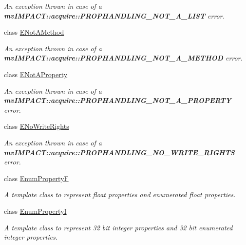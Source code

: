 \begin{DoxyCompactItemize}
\begin{DoxyCompactList}\small\item\em An exception thrown in case of a {\bfseries mv\+I\+M\+P\+A\+C\+T\+::acquire\+::\+P\+R\+O\+P\+H\+A\+N\+D\+L\+I\+N\+G\+\_\+\+N\+O\+T\+\_\+\+A\+\_\+\+L\+I\+S\+T} error. \end{DoxyCompactList}\item 
class \hyperlink{classmv_i_m_p_a_c_t_1_1acquire_1_1_e_not_a_method}{E\+Not\+A\+Method}
\begin{DoxyCompactList}\small\item\em An exception thrown in case of a {\bfseries mv\+I\+M\+P\+A\+C\+T\+::acquire\+::\+P\+R\+O\+P\+H\+A\+N\+D\+L\+I\+N\+G\+\_\+\+N\+O\+T\+\_\+\+A\+\_\+\+M\+E\+T\+H\+O\+D} error. \end{DoxyCompactList}\item 
class \hyperlink{classmv_i_m_p_a_c_t_1_1acquire_1_1_e_not_a_property}{E\+Not\+A\+Property}
\begin{DoxyCompactList}\small\item\em An exception thrown in case of a {\bfseries mv\+I\+M\+P\+A\+C\+T\+::acquire\+::\+P\+R\+O\+P\+H\+A\+N\+D\+L\+I\+N\+G\+\_\+\+N\+O\+T\+\_\+\+A\+\_\+\+P\+R\+O\+P\+E\+R\+T\+Y} error. \end{DoxyCompactList}\item 
class \hyperlink{classmv_i_m_p_a_c_t_1_1acquire_1_1_e_no_write_rights}{E\+No\+Write\+Rights}
\begin{DoxyCompactList}\small\item\em An exception thrown in case of a {\bfseries mv\+I\+M\+P\+A\+C\+T\+::acquire\+::\+P\+R\+O\+P\+H\+A\+N\+D\+L\+I\+N\+G\+\_\+\+N\+O\+\_\+\+W\+R\+I\+T\+E\+\_\+\+R\+I\+G\+H\+T\+S} error. \end{DoxyCompactList}\item 
class \hyperlink{classmv_i_m_p_a_c_t_1_1acquire_1_1_enum_property_f}{Enum\+Property\+F}
\begin{DoxyCompactList}\small\item\em A template class to represent float properties and enumerated float properties. \end{DoxyCompactList}\item 
class \hyperlink{classmv_i_m_p_a_c_t_1_1acquire_1_1_enum_property_i}{Enum\+Property\+I}
\begin{DoxyCompactList}\small\item\em A template class to represent 32 bit integer properties and 32 bit enumerated integer properties. \end{DoxyCompactList}\item 

\end{DoxyCompactItemize}
